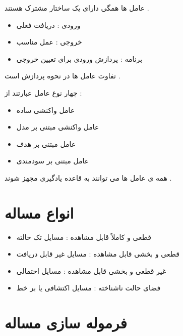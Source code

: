 \documentclass[12pt]{article}
\begin{document}
\noindent
عامل ها همگی دارای یک ساختار مشترک هستند .

\begin{itemize}
	\item ورودی : دریافت فعلی
	\item خروجی : عمل مناسب
	\item برنامه : پردازش ورودی برای تعیین خروجی
\end{itemize}




\noindent
تفاوت عامل ها در نحوه پردازش است .



\vspace{20pt}


چهار نوع عامل عبارتند از :

\begin{itemize}
	\item عامل واکنشی ساده
	\item عامل واکنشی مبتنی بر مدل
	\item عامل مبتنی بر هدف
	\item عامل مبتنی بر سودمندی
\end{itemize}


\noindent
همه ی عامل ها می توانند به قاعده یادگیری مجهز شوند .






\section{انواع مساله}


\begin{itemize}
	\item قطعی و کاملاً قابل مشاهده : مسایل تک حالته
	\item قطعی و بخشی قابل مشاهده : مسایل غیر قابل دریافت
	\item غیر قطعی و بخشی قابل مشاهده : مسایل احتمالی
	\item فضای حالت ناشناخته : مسایل اکتشافی یا بر خط
\end{itemize}








\section{فرموله سازی مساله}
\end{document}
